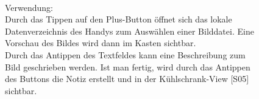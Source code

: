 \documentclass[a4paper]{scrreprt}
\begin{document}
\begin{figure}[h]
\begin{minipage}[b]{0.65\linewidth}
\begin{itemize}
    			\end{itemize}
    			
    			\hfill
    			\\
    			
    			Verwendung:\\
    			Durch das Tippen auf den Plus-Button öffnet 
    			sich das lokale Datenverzeichnis des Handys 
    			zum Auswählen einer Bilddatei. Eine Vorschau 
    			des Bildes wird dann im Kasten sichtbar.\\ 
    			Durch
    			das Antippen des Textfeldes kann eine
    			Beschreibung zum Bild geschrieben werden. Ist
    			man fertig, wird durch das Antippen des Buttons  
    			die Notiz erstellt und in der Kühlschrank-View 
    			{[}S05{]} sichtbar. 
    			
    			\vspace{1mm}
    			
    		\end{minipage}
    	\end{figure}
    	
\end{document}
